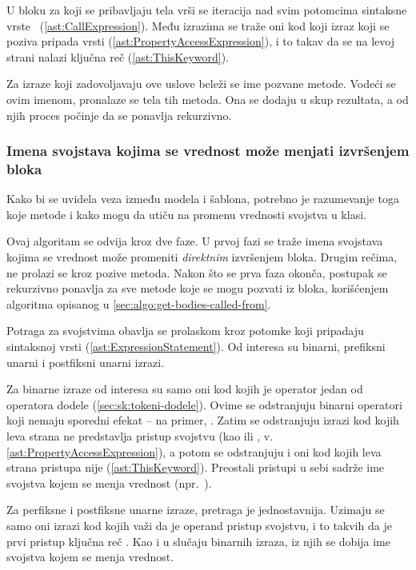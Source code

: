 U bloku za koji se pribavljaju tela vrši se iteracija nad svim potomcima sintaksne vrste~ (\cref{ast:CallExpression}).
Među izrazima se traže oni kod koji izraz koji se poziva pripada vrsti  (\cref{ast:PropertyAccessExpression}), i to takav da se na levoj strani nalazi ključna reč  (\cref{ast:ThisKeyword}).

Za izraze koji zadovoljavaju ove uslove beleži se ime pozvane metode.
Vodeći se ovim imenom, pronalaze se tela tih metoda.
Ona se dodaju u skup rezultata, a od njih proces počinje da se ponavlja rekurzivno.

\subsubsection{Imena svojstava kojima se vrednost može menjati izvršenjem bloka}\label{sec:algo:get-prop-names-which-can-be-modified-by}

Kako bi se uvidela veza između modela i šablona, potrebno je razumevanje toga koje metode i kako mogu da utiču na promenu vrednosti svojstva u klasi.

Ovaj algoritam se odvija kroz dve faze.
U prvoj fazi se traže imena svojstava kojima se vrednost može promeniti \emph{direktnim} izvršenjem bloka.
Drugim rečima, ne prolazi se kroz pozive metoda.
Nakon što se prva faza okonča, postupak se rekurzivno ponavlja za sve metode koje se mogu pozvati iz bloka, korišćenjem algoritma opisanog u \cref{sec:algo:get-bodies-called-from}.

Potraga za svojstvima obavlja se prolaskom kroz potomke koji pripadaju sintaksnoj vrsti  (\cref{ast:ExpressionStatement}).
Od interesa su binarni, prefiksni unarni i postfiksni unarni izrazi.

Za binarne izraze od interesa su samo oni kod kojih je operator jedan od operatora dodele (\cref{sec:sk:tokeni-dodele}).
Ovime se odstranjuju binarni operatori koji nemaju sporedni efekat -- na primer, .
Zatim se odstranjuju izrazi kod kojih leva strana ne predstavlja pristup svojstvu (kao  ili , v. \cref{ast:PropertyAccessExpression}), a potom se odstranjuju i oni kod kojih leva strana pristupa nije  (\cref{ast:ThisKeyword}).
Preostali pristupi u sebi sadrže ime svojstva kojem se menja vrednost (npr.~).

Za perfiksne i postfiksne unarne izraze, pretraga je jednostavnija.
Uzimaju se samo oni izrazi kod kojih važi da je operand pristup svojstvu, i to takvih da je prvi pristup ključna reč .
Kao i u slučaju binarnih izraza, iz njih se dobija ime svojstva kojem se menja vrednost.

